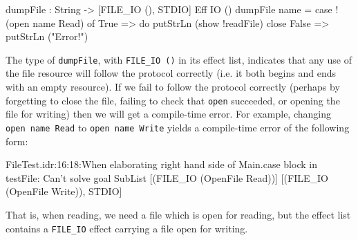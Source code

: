 \begin{code}
dumpFile : String -> { [FILE_IO (), STDIO] } Eff IO ()
dumpFile name = case !(open name Read) of
                    True => do putStrLn (show !readFile)
                               close
                    False => putStrLn ("Error!")
\end{code}

\noindent
The type of \texttt{dumpFile}, with \texttt{FILE\_IO ()} in its effect
list, indicates that any use of the file resource will follow the protocol
correctly (i.e. it both begins and ends with an empty resource). If we fail
to follow the protocol correctly (perhaps by forgetting to close the file,
failing to check that \texttt{open} succeeded, or opening the file for writing)
then we will get a compile-time error. For example, changing \texttt{open name Read}
to \texttt{open name Write} yields a compile-time error of the following
form:

\begin{code}
FileTest.idr:16:18:When elaborating right hand side of Main.case 
block in testFile:
Can't solve goal 
        SubList [(FILE_IO (OpenFile Read))]
                [(FILE_IO (OpenFile Write)), STDIO]
\end{code}

\noindent
That is, when reading, we need a file which is open for reading, but the
effect list contains a \texttt{FILE\_IO} effect carrying a file open for
writing.




